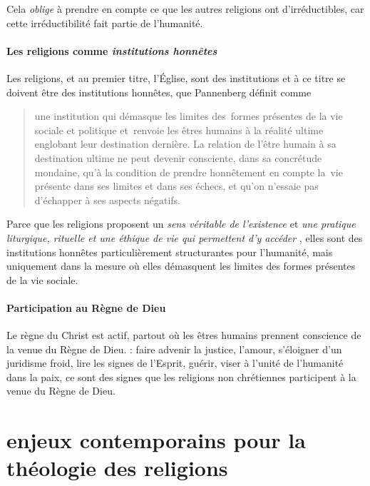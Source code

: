  Cela \textit{oblige} à prendre en compte ce que les autres religions ont d'irréductibles, car cette irréductibilité fait partie de l'humanité.  
\paragraph{Les religions comme \textit{institutions honnêtes}}
Les religions, et au premier titre, l'Église, sont des institutions et à ce titre se doivent être des institutions honnêtes, que Pannenberg définit comme
\begin{quote}
      une institution qui démasque les limites des formes présentes de la vie sociale et politique et renvoie les êtres humains à la réalité ultime englobant leur destination dernière. La relation de l’être humain à sa destination ultime ne peut devenir consciente, dans sa concrétude mondaine, qu’à la condition de prendre honnêtement en compte la vie présente dans ses limites et dans ses échecs, et qu’on n’essaie pas d’échapper à ses aspects négatifs.\cite[pp. 98]{Pannenberg:RoyaumeDieu}
\end{quote}
Parce que les religions proposent un \textit{ sens véritable de l'existence} et \textit{une pratique liturgique, rituelle et une éthique de vie qui permettent d'y accéder} , elles sont des institutions honnêtes particulièrement structurantes pour l'humanité, mais uniquement dans la mesure où elles démasquent les limites des formes présentes de la vie sociale.

\paragraph{Participation au Règne de Dieu }
Le règne du Christ est actif, partout où les êtres humains prennent conscience de la venue du Règne de Dieu.\cite[p. 85]{Pannenberg:RoyaumeDieu} : faire advenir la justice, l'amour, s'éloigner d'un juridisme froid, lire les signes de l'Esprit, guérir, viser à l'unité de l'humanité dans la paix, ce sont des signes que les religions non chrétiennes participent à la venue du Règne de Dieu.



\section{enjeux contemporains pour la théologie des religions}    

